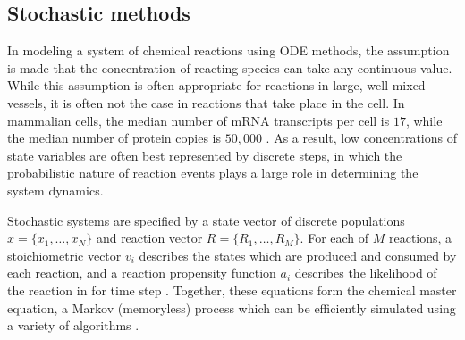 \subsection{Stochastic methods}\label{sec:stoch}

In modeling a system of chemical reactions using ODE methods, the assumption is made that the concentration of reacting species can take any continuous value. 
While this assumption is often appropriate for reactions in large, well-mixed vessels, it is often not the case in reactions that take place in the cell.
In mammalian cells, the median number of mRNA transcripts per cell is $17$, while the median number of protein copies is $50,000$ \cite{Schwanhausser2011}.
As a result, low concentrations of state variables are often best represented by discrete steps, in which the probabilistic nature of reaction events plays a large role in determining the system dynamics.

Stochastic systems are specified by a state vector of discrete populations $x = \{x_1, \ldots, x_N\}$ and reaction vector $R = \{R_1, \ldots, R_M\}$. 
For each of $M$ reactions, a stoichiometric vector $v_i$ describes the states which are produced and consumed by each reaction, and a reaction propensity function $a_i$ describes the likelihood of the reaction in for time step \cite{Gillespie1977}.
Together, these equations form the chemical master equation, a Markov (memoryless) process which can be efficiently simulated using a variety of algorithms \cite{Sanft2011}.



